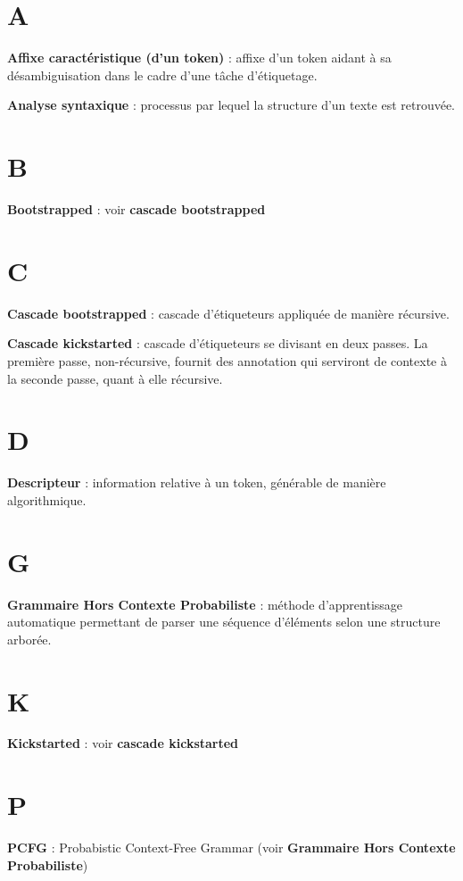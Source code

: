 \documentclass[PhD-Yoann-Dupont.tex]{subfiles}
\begin{document}
\section*{A}
\textbf{Affixe caractéristique (d'un token)} : affixe d'un token aidant à sa désambiguisation dans le cadre d'une tâche d'étiquetage.

\textbf{Analyse syntaxique} : processus par lequel la structure d'un texte est retrouvée.

\section*{B}
\textbf{Bootstrapped} : voir \textbf{cascade bootstrapped}

\section*{C}
\textbf{Cascade bootstrapped} : cascade d'étiqueteurs appliquée de manière récursive.

\textbf{Cascade kickstarted} : cascade d'étiqueteurs se divisant en deux passes. La première passe, non-récursive, fournit des annotation qui serviront de contexte à la seconde passe, quant à elle récursive.

\section*{D}
\textbf{Descripteur} : information relative à un token, générable de manière algorithmique.

\section*{G}
\textbf{Grammaire Hors Contexte Probabiliste} : méthode d'apprentissage automatique permettant de parser une séquence d'éléments selon une structure arborée.

\section*{K}
\textbf{Kickstarted} : voir \textbf{cascade kickstarted}


\section*{P}
\textbf{PCFG} : Probabistic Context-Free Grammar (voir \textbf{Grammaire Hors Contexte Probabiliste})
\end{document}
